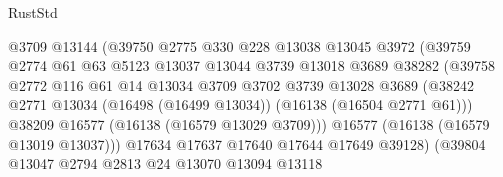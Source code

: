 \begin{lexlean}{RustStd}
\begin{coremodule}
                                    @3709
                                    @13144
                                    (@39750
                                      @2775
                                      @330
                                      @228
                                      @13038
                                      @13045
                                      @3972
                                      (@39759
                                        @2774
                                        @61
                                        @63
                                        @5123
                                        @13037
                                        @13044
                                        @3739
                                        @13018
                                        @3689
                                        @38282
                                        (@39758
                                          @2772
                                          @116
                                          @61
                                          @14
                                          @13034
                                          @3709
                                          @3702
                                          @3739
                                          @13028
                                          @3689
                                          (@38242
                                            @2771
                                            @13034
                                            (@16498 (@16499 @13034))
                                            (@16138 (@16504 @2771 @61)))
                                          @38209
                                          @16577
                                          (@16138 (@16579 @13029 @3709)))
                                        @16577
                                        (@16138 (@16579 @13019 @13037)))
                                      @17634
                                      @17637
                                      @17640
                                      @17644
                                      @17649
                                      @39128)
                                    (@39804
                                      @13047
                                      @2794
                                      @2813
                                      @24
                                      @13070
                                      @13094
                                      @13118

\end{coremodule}
\end{lexlean}
